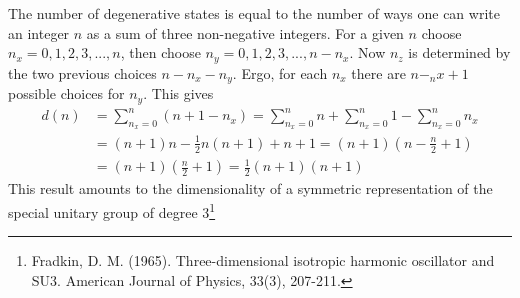 \documentclass{article}
\begin{document}
The number of degenerative states is equal to the number of ways one can write an integer $n$ as a sum of three non-negative integers. For a given $n$ choose $n_x=0,1,2,3,...,n$, then choose $n_y=0,1,2,3,...,n-n_x$. Now $n_z$ is determined by the two previous choices $n-n_x-n_y$. Ergo, for each $n_x$ there are $n-_nx+1$ possible choices for $n_y$. This gives
\begin{align*}
d(n)&=\sum_{n_x=0}^n (n+1-n_x) = \sum_{n_x=0}^n n  +\sum_{n_x=0}^n 1 - \sum_{n_x=0}^n n_x \\
&= (n+1)n-\frac{1}{2}n(n+1)+n+1 = (n+1)\left(n-\frac{n}{2}+1 \right) \\
&= (n+1)\left(\frac{n}{2} +1\right) = \frac{1}{2}(n+1)(n+1)
\end{align*}
This result amounts to the dimensionality of a symmetric representation of the special unitary group of degree 3\footnote{Fradkin, D. M. (1965). Three-dimensional isotropic harmonic oscillator and SU3. American Journal of Physics, 33(3), 207-211.}
\end{document}
